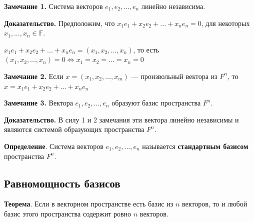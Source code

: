 \documentclass[a4paper]{article}
\begin{document}
    \begin{htheorem}
        \textbf{Замечание 1.} Система векторов $e_1, e_2, ..., e_n$ линейно независима.
    \end{htheorem}


    \begin{hproof}
        \textbf{Доказательство.} Предположим, что $x_1e_1+x_2e_2 + ... + x_ne_n = 0$, для некоторых $x_1, ..., x_n \in \mathbb{F}$.

        $x_1e_1+x_2e_2 + ... + x_ne_n = (x_1, x_2, ..., x_n)$, то есть $(x_1, x_2, ..., x_n) = 0 \Leftrightarrow x_1 = x_2 = ... = x_n = 0$
    \end{hproof}

    \begin{htheorem}
        \textbf{Замечание 2.} Если $x = (x_1, x_2, ..., x_m) $ --- произвольный вектора из $F^n$, то \newline $x = x_1e_1 + x_2e_2 + ... + x_ne_n$
    \end{htheorem}


    \begin{htheorem}
        \textbf{Замечание 3.} Вектора $e_1, e_2, ..., e_n$ образуют базис пространства $F^n$.
    \end{htheorem}

    \begin{hproof}
        \textbf{Доказательство.} В силу 1 и 2 замечания эти вектора линейно независимы и являются системой образующих пространства $F^n$.
    \end{hproof}

    \textbf{Определение}. Система векторов $e_1, e_2, ..., e_n$ называется \textbf{стандартным базисом} пространства $F^n$.

    \subsection*{Равномощность базисов}

    \begin{htheorem}
        \textbf{Теорема}. Если в векторном пространстве есть базис из $n$ векторов, то и любой базис этого пространства содержит ровно $n$ векторов.
    \end{htheorem}
\end{document}
